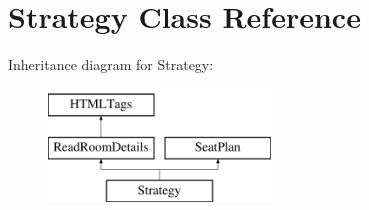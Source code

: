\hypertarget{classStrategy}{\section{Strategy Class Reference}
\label{classStrategy}
}
Inheritance diagram for Strategy\-:\begin{figure}[H]
\begin{center}
\leavevmode
\includegraphics[height=3.000000cm]{classStrategy}
\end{center}
\end{figure}
